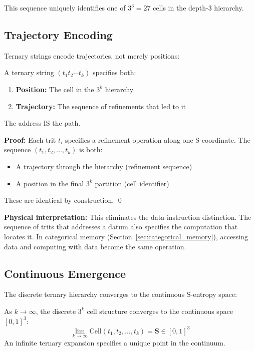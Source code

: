 This sequence uniquely identifies one of $3^3 = 27$ cells in the depth-3 hierarchy.

\subsection{Trajectory Encoding}

Ternary strings encode trajectories, not merely positions:

\begin{theorem}
\label{thm:trajectory_position_duality}
A ternary string $(t_1 t_2 \cdots t_k)$ specifies both:
\begin{enumerate}
\item \textbf{Position:} The cell in the $3^k$ hierarchy
\item \textbf{Trajectory:} The sequence of refinements that led to it
\end{enumerate}
The address IS the path.
\end{theorem}

\textbf{Proof:} Each trit $t_i$ specifies a refinement operation along one S-coordinate. The sequence $(t_1, t_2, \ldots, t_k)$ is both:
\begin{itemize}
\item A trajectory through the hierarchy (refinement sequence)
\item A position in the final $3^k$ partition (cell identifier)
\end{itemize}
These are identical by construction. \qed

\textbf{Physical interpretation:} This eliminates the data-instruction distinction. The sequence of trits that addresses a datum also specifies the computation that locates it. In categorical memory (Section~\ref{sec:categorical_memory}), accessing data and computing with data become the same operation.

\subsection{Continuous Emergence}

The discrete ternary hierarchy converges to the continuous S-entropy space:

\begin{theorem}
\label{thm:continuous_emergence}
As $k \to \infty$, the discrete $3^k$ cell structure converges to the continuous space $[0,1]^3$:
\begin{equation}
\lim_{k \to \infty} \text{Cell}(t_1, t_2, \ldots, t_k) = \mathbf{S} \in [0,1]^3
\end{equation}
An infinite ternary expansion specifies a unique point in the continuum.
\end{theorem}

